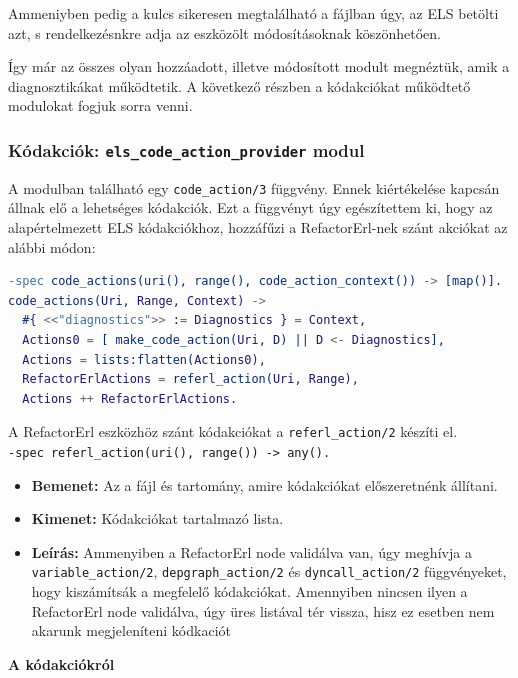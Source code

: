 Ammeniyben pedig a kulcs sikeresen megtalálható a fájlban úgy, az ELS betölti azt, s rendelkezésnkre adja az eszközölt módosításoknak köszönhetően.

Így már az összes olyan hozzáadott, illetve módosított modult megnéztük, amik a diagnosztikákat működtetik. A következő részben a kódakciókat működtető modulokat fogjuk sorra venni. 


\subsubsection{Kódakciók: \lstinline{els_code_action_provider} modul }
A modulban található egy \lstinline{code_action/3} függvény. Ennek kiértékelése kapcsán állnak elő a lehetséges kódakciók. Ezt a függvényt úgy egészítettem ki, hogy az alapértelmezett ELS kódakciókhoz, hozzáfűzi a RefactorErl-nek szánt akciókat az alábbi módon:

\begin{lstlisting}[language={erlang}]
-spec code_actions(uri(), range(), code_action_context()) -> [map()].
code_actions(Uri, Range, Context) ->
  #{ <<"diagnostics">> := Diagnostics } = Context,
  Actions0 = [ make_code_action(Uri, D) || D <- Diagnostics],
  Actions = lists:flatten(Actions0),
  RefactorErlActions = referl_action(Uri, Range),
  Actions ++ RefactorErlActions.
\end{lstlisting}

\noindent A RefactorErl eszközhöz szánt kódakciókat a \lstinline{referl_action/2} készíti el. \\
\noindent \lstinline{-spec referl_action(uri(), range()) -> any().}
\begin{itemize}
    \item \textbf{Bemenet:} Az a fájl és tartomány, amire kódakciókat előszeretnénk állítani.
    \item \textbf{Kimenet:} Kódakciókat tartalmazó lista.
    \item \textbf{Leírás:} Ammenyiben a RefactorErl node validálva van, úgy meghívja a \lstinline{variable_action/2}, \lstinline{depgraph_action/2} és \lstinline{dyncall_action/2} függvényeket, hogy kiszámítsák a megfelelő kódakciókat. Amennyiben nincsen ilyen a RefactorErl node validálva, úgy üres listával tér vissza, hisz ez esetben nem akarunk megjeleníteni kódkaciót
\end{itemize}

\noindent \textbf{A kódakciókról}

